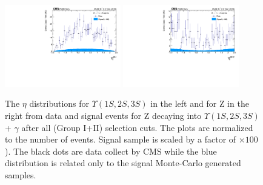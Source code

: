 \begin{figure}[!htbp]
\begin{center}
\includegraphics[width=0.45\textwidth]{figures_and_tables/outputPlots/ZtoUpsilon_Cat0_ZZZZZ/nEvts/data_x_mc/withKinCuts/h_withKin_Upsilon_eta}\hspace*{1.cm}
\includegraphics[width=0.45\textwidth]{figures_and_tables/outputPlots/ZtoUpsilon_Cat0_ZZZZZ/nEvts/data_x_mc/withKinCuts/h_withKin_Z_eta}
\end{center}\vspace*{-.5cm}
\caption{The $\eta$ distributions for $\Upsilon(1S,2S,3S)$ in the left and for Z in the right from data and signal events for Z decaying into $\Upsilon(1S,2S,3S)$ + $\gamma$ after all (Group I+II) selection cuts. The plots are normalized to the number of events. Signal sample is scaled by a factor of $\times 100$). The black dots are data collect by CMS while the blue distribution is related only to the signal Monte-Carlo generated samples.}
\label{fig:etaUpsilon_and_Z_ZtoUpsilon_Cat0_groupI_plus_II}
\end{figure}

